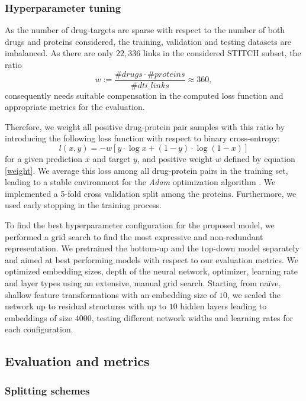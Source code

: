 \documentclass{bioinfo}
\begin{document}
\subsubsection{Hyperparameter tuning}
As the number of drug-targets are sparse with respect to the number of
both drugs and proteins considered, the training, validation and
testing datasets are imbalanced. As there are only $22,336$ links in
the considered STITCH subset, the ratio
\begin{equation}
	w:= \frac{\#drugs \cdot \#proteins}{\#dti\_links} \approx 360,
	\label{weight}
\end{equation}
consequently needs suitable compensation in the computed loss function and
appropriate metrics for the evaluation.

Therefore, we weight all positive drug-protein pair samples with this
ratio by introducing the following loss function with respect to 
binary cross-entropy:
\begin{equation}
	l(x,y) = - w \left[ y \cdot \log x + (1 - y) \cdot \log (1 - x) \right]
\end{equation}
for a given prediction $x$ and target $y$, and positive weight $w$
defined by equation \eqref{weight}. We average this loss among all
drug-protein pairs in the training set, leading to a stable
environment for the \textit{Adam} optimization algorithm
\citep{Adam2014}. We implemented a 5-fold cross validation split among
the proteins. Furthermore, we used early stopping in the training
process.

To find the best hyperparameter configuration for the proposed model,
we performed a grid search to find the most expressive and
non-redundant representation. We pretrained the bottom-up and the
top-down model separately and aimed at best performing models
with respect to our evaluation metrics. We optimized embedding sizes,
depth of the neural network, optimizer, learning rate and layer types
using an extensive, manual grid search. Starting from na\"ive, shallow
feature transformations with an embedding size of $10$, we scaled the
network up to residual structures with up to $10$ hidden layers
leading to embeddings of size $4000$, testing different network widths
and learning rates for each configuration.

\subsection{Evaluation and metrics}

\subsubsection{Splitting schemes}
\end{document}

